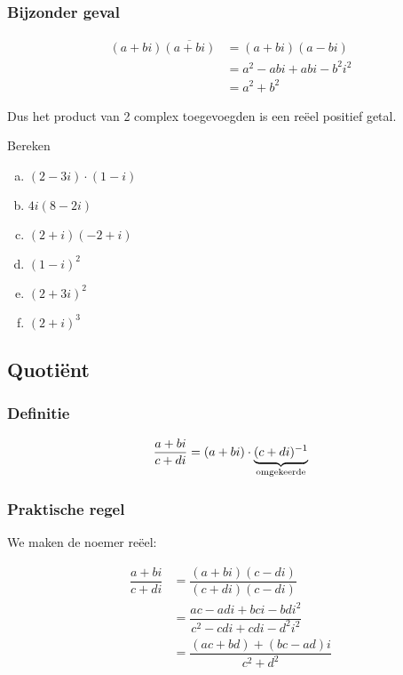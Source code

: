 \documentclass[12pt,twoside,a4paper]{article}
\begin{document}
\subsubsection*{Bijzonder geval}
\begin{align*}
  (a+bi)\overline{(a+bi)} &= (a+bi)(a-bi) \\
                          &= a^2 - abi + abi - b^2i^2 \\
                          &= a^2 + b^2
\end{align*}

Dus het product van 2 complex toegevoegden is een reëel positief getal.


\begin{oefening}
  Bereken
  \begin{multicols}{2}
  \begin{enumerate}[(a)]
  \itemsep1em
  \item $\displaystyle (2-3i)\cdot (1-i)$
  \item $\displaystyle 4i(8-2i)$
  \item $\displaystyle (2+i)(-2+i)$
  \item $\displaystyle (1-i)^2$
  \item $\displaystyle (2+3i)^2$
  \item $\displaystyle (2+i)^3$
  \end{enumerate}
  \end{multicols}
\end{oefening}

\subsection{Quotiënt}

\subsubsection*{Definitie}
\begin{mdframed}
$$\dfrac{a+bi}{c+di} = (a+bi)\cdot\underbrace{(c+di)^{-1}}_{\mbox{\scriptsize omgekeerde}}$$
\end{mdframed}

\subsubsection*{Praktische regel}

We maken de noemer reëel:

\begin{align*}
  \dfrac{a+bi}{c+di} &= \dfrac{(a+bi)(c-di)}{(c+di)(c-di)} \\
                     &= \dfrac{ac-adi + bci - bdi^2}{c^2 - cdi + cdi -d^2i^2}\\
                     &= \dfrac{(ac + bd) + (bc -ad)i}{c^2 + d^2}
\end{align*}
\end{document}
